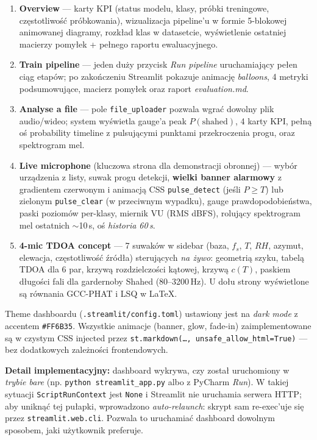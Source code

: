 \documentclass[11pt,a4paper]{article}
\begin{document}
\begin{enumerate}[noitemsep]
  \item \textbf{Overview} --- karty KPI (status modelu, klasy, próbki
        treningowe, częstotliwość próbkowania), wizualizacja pipeline'u w
        formie 5-blokowej animowanej diagramy, rozkład klas w datasetcie,
        wyświetlenie ostatniej macierzy pomyłek + pełnego raportu
        ewaluacyjnego.
  \item \textbf{Train pipeline} --- jeden duży przycisk \emph{Run pipeline}
        uruchamiający pełen ciąg etapów; po zakończeniu Streamlit pokazuje
        animację \emph{balloons}, 4 metryki podsumowujące, macierz pomyłek
        oraz raport \emph{evaluation.md}.
  \item \textbf{Analyse a file} --- pole \texttt{file\_uploader} pozwala
        wgrać dowolny plik audio/wideo; system wyświetla gauge'a peak
        $P(\text{shahed})$, 4 karty KPI, pełną oś probability timeline z
        pulsującymi punktami przekroczenia progu, oraz spektrogram mel.
  \item \textbf{Live microphone} (kluczowa strona dla demonstracji
        obronnej) --- wybór urządzenia z listy, suwak progu detekcji,
        \textbf{wielki banner alarmowy} z gradientem czerwonym i animacją
        CSS \texttt{pulse\_detect} (jeśli $P \geq T$) lub zielonym
        \texttt{pulse\_clear} (w przeciwnym wypadku), gauge prawdopodobieństwa,
        paski poziomów per-klasy, miernik VU (RMS dBFS), rolujący spektrogram
        mel ostatnich $\sim$10\,s, oś \emph{historia 60\,s}.
  \item \textbf{4-mic TDOA concept} --- 7 suwaków w sidebar (baza, $f_s$,
        $T$, $RH$, azymut, elewacja, częstotliwość źródła) sterujących
        \emph{na żywo}: geometrią szyku, tabelą TDOA dla 6 par, krzywą
        rozdzielczości kątowej, krzywą $c(T)$, paskiem długości fali dla
        gardernoby Shahed (80--3200\,Hz). U dołu strony wyświetlone są
        równania GCC-PHAT i LSQ w \LaTeX.
\end{enumerate}

Theme dashboardu (\texttt{.streamlit/config.toml}) ustawiony jest na \emph{dark
mode} z accentem \texttt{\#FF6B35}. Wszystkie animacje (banner, glow, fade-in)
zaimplementowane są w czystym CSS injected przez \texttt{st.markdown(\dots,
unsafe\_allow\_html=True)} --- bez dodatkowych zależności frontendowych.

\textbf{Detail implementacyjny:} dashboard wykrywa, czy został uruchomiony w
\emph{trybie bare} (np. \texttt{python streamlit\_app.py} albo z PyCharm
\emph{Run}). W takiej sytuacji \texttt{ScriptRunContext} jest \texttt{None}
i Streamlit nie uruchamia serwera HTTP; aby uniknąć tej pułapki, wprowadzono
\emph{auto-relaunch}: skrypt sam re-exec'uje się przez \texttt{streamlit.web.cli}.
Pozwala to uruchamiać dashboard dowolnym sposobem, jaki użytkownik preferuje.
\end{document}
